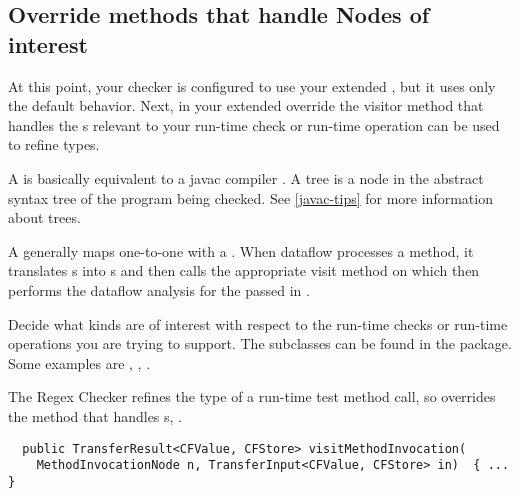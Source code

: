 \subsection{Override methods that handle Nodes of
interest\label{dataflow-override-methods}}

At this point, your checker is configured to use your extended
, but it uses only the default
behavior. Next, in your extended 
override the visitor method that handles the s
relevant to your run-time check or run-time operation can be used to refine
types.

A  is basically equivalent to a javac compiler
.  A tree is a node in the abstract syntax tree of the
program being checked. See \ref{javac-tips} for more information about trees.

A  generally maps one-to-one with a
. When dataflow processes a method, it translates
s into s and then
calls the appropriate visit method on
 which then performs the dataflow
analysis for the passed in .

Decide what  kinds are of interest with
respect to the run-time checks or run-time operations you are trying to support.
The  subclasses can be found in the
 package.  Some examples are
,
,
.

The Regex Checker refines the type of a run-time test method call, so
 overrides the method that handles
s,
.

\begin{smaller}
\begin{Verbatim}
  public TransferResult<CFValue, CFStore> visitMethodInvocation(
    MethodInvocationNode n, TransferInput<CFValue, CFStore> in)  { ... }
\end{Verbatim}
\end{smaller}

